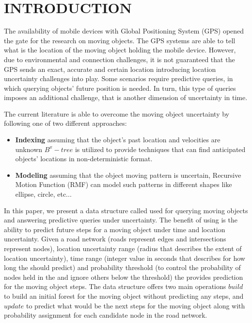 \chapter{INTRODUCTION}
\label{sect:introduction}
The availability of mobile devices with Global Positioning System (GPS) opened the gate for the research on moving objects. The GPS systems are able to tell what is the location of the moving object holding the mobile device. However, due to environmental and connection challenges, it is not guaranteed that the GPS sends an exact, accurate and certain location introducing location uncertainty challenges into play. Some scenarios require predictive queries, in which querying objects' future position is needed. In turn, this type of queries imposes an additional challenge, that is another dimension of uncertainty in time.


The current literature is able to overcome the moving object uncertainty by following one of two different approaches:
\begin{itemize}
\item \textbf{Indexing} \cite{Zhang09} assuming that the object's past location and velocities are unknown $B^x-tree$ is utilized to provide techniques that can find anticipated objects' locations
in non-deterministic format.
\item \textbf{Modeling} assuming that the object moving pattern is uncertain, Recursive Motion Function (RMF) can model such patterns in different shapes like ellipse, circle, etc...
\end{itemize}

In this paper, we present a data structure called \pf used for querying moving objects and answering predictive queries under uncertainty. The benefit of using \pf is the ability to predict future steps for a moving object under time and location uncertainty. Given a road network (roads represent edges and intersections represent nodes), location uncertainty range (radius that describes the extent of location uncertainty), time range (integer value in seconds that describes for how long the \pf should predict) and probability threshold (to control the probability of nodes held in the \pf and ignore others below the threshold) the \pf provides prediction for the moving object steps. The \pf data structure offers two main operations $build$ to build an initial forest for the moving object without predicting any steps, and $update$ to predict what would be the next steps for the moving object along with probability assignment for each candidate node in the road network.

